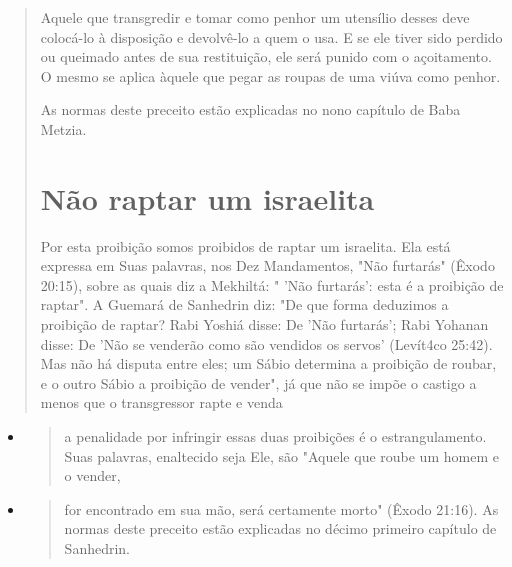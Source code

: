 \begin{quote}
Aquele que transgredir e tomar como penhor um utensílio desses deve
colocá-lo à disposição e devolvê-lo a quem o usa. E se ele tiver sido
per­dido ou queimado antes de sua restituição, ele será punido com o
açoita­mento. O mesmo se aplica àquele que pegar as roupas de uma viúva
como penhor.

As normas deste preceito estão explicadas no nono capítulo de Baba
Metzia.

\section{Não raptar um israelita}

Por esta proibição somos proibidos de raptar um israelita. Ela está
expressa em Suas palavras, nos Dez Mandamentos, "Não furtarás" (Êxodo
20:15), sobre as quais diz a Mekhiltá: " 'Não furtarás': esta é a
proibição de raptar". A Guemará de Sanhedrin diz: "De que forma
deduzimos a proibição de raptar? Rabi Yoshiá disse: De 'Não furtarás';
Rabi Yohanan disse: De 'Não se venderão como são vendidos os servos'
(Levít4co 25:42). Mas não há disputa entre eles; um Sábio determina a
proibição de roubar, e o outro Sábio a proibição de ven­der", já que não
se impõe o castigo a menos que o transgressor rapte e venda

\end{quote}

\begin{itemize}
\item
 \begin{quote}
 a penalidade por infringir essas duas proibições é o estrangulamento.
 Suas palavras, enaltecido seja Ele, são "Aquele que roube um homem e o
 vender,
 \end{quote}
\item
 \begin{quote}
 for encontrado em sua mão, será certamente morto" (Êxodo 21:16). As
 normas deste preceito estão explicadas no décimo primeiro capí­tulo de
 Sanhedrin.
 \end{quote}
\end{itemize}

